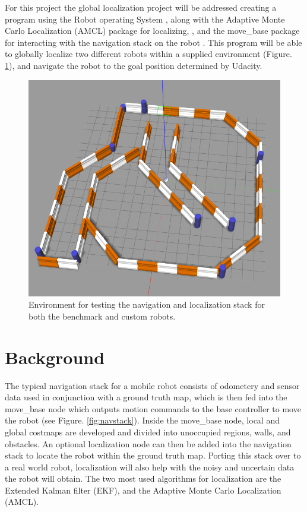 \documentclass[10pt,journal,compsoc]{IEEEtran}
\begin{document}
For this project the global localization project will be addressed creating a program using the Robot operating System \cite{ROSWiki}, along with the Adaptive Monte Carlo Localization (AMCL) package for localizing, \cite{ROSAMCL}, and the move\_base package for interacting with the navigation stack on the robot \cite{ROSMoveBase}. This program will be able to globally localize two different robots within a supplied environment (Figure. \ref{fig:environment}), and navigate the robot to the goal position determined by Udacity.

\begin{figure}[thpb]
      \centering
      \includegraphics[width=\linewidth]{../img/map-overview.png}
      \caption{Environment for testing the navigation and localization stack for both the benchmark and custom robots.}
      \label{fig:environment}
\end{figure}

\section{Background}

The typical navigation stack for a mobile robot consists of odometery and sensor data used in conjunction with a ground truth map, which is then fed into the move\_base node which outputs motion commands to the base controller to move the robot (see Figure. \ref{fig:navstack}). Inside the move\_base node, local and global costmaps are developed and divided into unoccupied regions, walls, and obstacles. An optional localization node can then be added into the navigation stack to locate the robot within the ground truth map. Porting this stack over to a real world robot, localization will also help with the noisy and uncertain data the robot will obtain. The two most used algorithms for localization are the Extended Kalman filter (EKF), and the Adaptive Monte Carlo Localization (AMCL).
\end{document}
